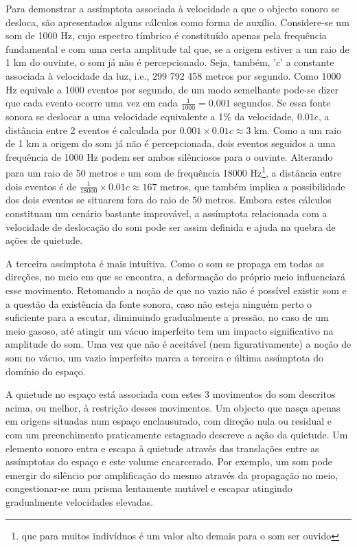 \documentclass[../main.tex]{subfiles}
\begin{document}
Para demonstrar a assímptota associada à velocidade a que o objecto sonoro se desloca, são apresentados alguns cálculos como forma de auxílio. Considere-se um som de 1000 Hz, cujo espectro tímbrico é constituído apenas pela frequência fundamental e com uma certa amplitude tal que, se a origem estiver a um raio de 1 km do ouvinte, o som já não é percepcionado. Seja, também, '$c$' a constante associada à velocidade da luz, i.e., 299 792 458 metros por segundo\cite{penrose2004road}. Como 1000 Hz equivale a 1000 eventos por segundo, de um modo semelhante pode-se dizer que cada evento ocorre uma vez em cada $\frac{1}{1000} = 0.001$ segundos. Se essa fonte sonora se deslocar a uma velocidade equivalente a 1\% da velocidade, $0.01c$, a distância entre 2 eventos é calculada por $0.001 \times 0.01c \approx 3$ km. Como a um raio de 1 km a origem do som já não é percepcionada, dois eventos seguidos a uma frequência de 1000 Hz podem ser ambos silênciosos para o ouvinte. Alterando para um raio de 50 metros e um som de frequência 18000 Hz\footnote{que para muitos indivíduos é um valor alto demais para o som ser ouvido\cite{olson}}, a distância entre dois eventos é de $\frac{1}{18000}\times 0.01c \approx 167$ metros, que também implica a possibilidade dos dois eventos se situarem fora do raio de 50 metros. Embora estes cálculos constituam um cenário bastante improvável, a assímptota relacionada com a velocidade de deslocação do som pode ser assim definida e ajuda na quebra de ações de quietude.

A terceira assímptota é mais intuitiva. Como o som se propaga em todas as direções, no meio em que se encontra, a deformação do próprio meio influenciará esse movimento. Retomando a noção de que no vazio não é possível existir som e a questão da existência da fonte sonora, caso não esteja ninguém perto o suficiente para a escutar, diminuindo gradualmente a pressão, no caso de um meio gasoso, até atingir um vácuo imperfeito tem um impacto significativo na amplitude do som\cite{kinsler2000fundamentals}. Uma vez que não é aceitável (nem figurativamente) a noção de som no vácuo, um vazio imperfeito marca a terceira e última assímptota do domínio do espaço.

A quietude no espaço está associada com estes 3 movimentos do som descritos acima, ou melhor, à restrição desses movimentos. Um objecto que nasça apenas em origens situadas num espaço enclausurado, com direção nula ou residual e com um preenchimento praticamente estagnado descreve a ação da quietude. Um elemento sonoro entra e escapa à quietude através das translações entre as assímptotas do espaço e este volume encarcerado. Por exemplo, um som pode emergir do silêncio por amplificação do mesmo através da propagação no meio, congestionar-se num prisma lentamente mutável e escapar atingindo gradualmente velocidades elevadas.
\end{document}
